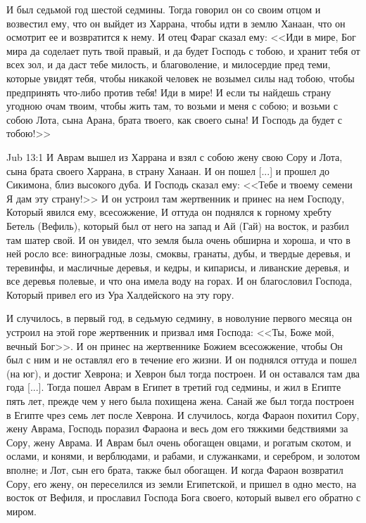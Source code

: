 И был седьмой год шестой седмины. Тогда говорил
он со своим отцом и возвестил ему, что он выйдет
из Харрана, чтобы идти в землю Ханаан, что он
осмотрит ее и возвратится к нему. И отец Фараг
сказал ему: <<Иди в мире, Бог мира да соделает
путь твой правый, и да будет Господь с тобою, и
хранит тебя от всех зол, и да даст тебе милость, и
благоволение, и милосердие пред теми, которые
увидят тебя, чтобы никакой человек не возымел
силы над тобою, чтобы предпринять что-либо против
тебя! Иди в мире! И если ты найдешь страну угодною
очам твоим, чтобы жить там, то возьми и меня с
собою; и возьми с собою Лота, сына Арана, брата
твоего, как своего сына! И Господь да будет с
тобою!>>

\vs Jub 13:1
И Аврам вышел из Харрана и взял с собою жену
свою Сору и Лота, сына брата своего Харрана, в
страну Ханаан. И он пошел [...] и прошел до Сикимона,
близ высокого дуба. И Господь сказал ему: <<Тебе
и твоему семени Я дам эту страну!>> И он устроил
там жертвенник и принес на нем Господу, Который
явился ему, всесожжение, И оттуда он поднялся к
горному хребту Бетель (Вефиль), который был от
него на запад и Ай (Гай) на восток, и разбил там
шатер свой. И он увидел, что земля была очень
обширна и хороша, и что в ней росло все:
виноградные лозы, смоквы, гранаты, дубы, и твердые
деревья, и теревинфы, и масличные деревья, и
кедры, и кипарисы, и ливанские деревья, и все
деревья полевые, и что она имела воду на горах. И
он благословил Господа, Который привел его из Ура
Халдейского на эту гору.

И случилось, в первый год, в седьмую седмину, в
новолуние первого месяца он устроил на этой горе
жертвенник и призвал имя Господа: <<Ты, Боже мой,
вечный Бог>>. И он принес на жертвеннике Божием
всесожжение, чтобы Он был с ним и не оставлял его
в течение его жизни. И он поднялся оттуда и пошел
(на юг), и достиг Хеврона; и Хеврон был тогда
построен. И он оставался там два года [...]. Тогда
пошел Аврам в Египет в третий год седмины, и жил
в Египте пять лет, прежде чем у него была похищена
жена. Санай же был тогда построен в Египте чрез
семь лет после Хеврона. И случилось, когда Фараон
похитил Сору, жену Аврама, Господь поразил
Фараона и весь дом его тяжкими бедствиями за
Сору, жену Аврама. И Аврам был очень обогащен
овцами, и рогатым скотом, и ослами, и конями, и
верблюдами, и рабами, и служанками, и серебром, и
золотом вполне; и Лот, сын его брата, также был
обогащен. И когда Фараон возвратил Сору, его жену,
он переселился из земли Египетской, и пришел в
одно место, на восток от Вефиля, и прославил
Господа Бога своего, который вывел его обратно с
миром.

